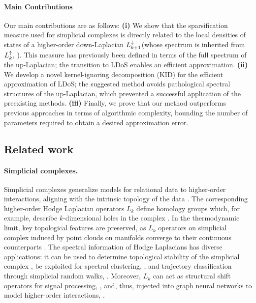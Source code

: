 \paragraph{Main Contributions } 
Our main contributions are as follows: \textbf{(i)} We show that the sparsification measure used for simplicial complexes is directly related to the local densities of states of a higher-order down-Laplacian {\( L_{k+1}^{\downarrow} \)(whose spectrum is inherited from \( L_{k}^{\uparrow} \), \cite{guglielmi2023quantifying})}.
This measure has previously been defined in terms of the full spectrum of the up-Laplacian; the transition to LDoS enables an efficient approximation.
\textbf{(ii)} We develop a novel kernel-ignoring decomposition (KID) for the efficient approximation of LDoS; the suggested method avoids pathological spectral structures of the up-Laplacian, which prevented a successful application of the preexisting methods.
\textbf{(iii)} Finally, we prove that our method outperforms previous approaches in terms of algorithmic complexity, bounding the number of parameters required to obtain a desired approximation error. 



\subsection*{ Related work }
 
\paragraph{Simplicial complexes.}

Simplicial complexes generalize models for relational data to higher-order interactions, aligning with the intrinsic topology of the data \cite{quillen2006homotopical, munkres2018elements}. The corresponding higher-order Hodge Laplacian operators \( L_k \) define homology groups which, for example, describe \( k \)-dimensional holes in the complex \cite{Lim15}. In the thermodynamic limit, key topological features are preserved, as \( L_k \) operators on simplicial complex induced by point clouds on manifolds converge to their continuous counterparts \cite{chen2021decomposition,chen2021helmholtzian}. The spectral information of Hodge Laplacians has diverse applications: it can be used to determine topological stability of the simplicial complex \cite{guglielmi2023quantifying}, 
be exploited for spectral clustering, \cite{ebli2019notion,grande2024node}, and trajectory classification through simplicial random walks, \cite{schaub2019random,grande2024topological}. Moreover, \( L_k \) can act as structural shift operators for signal processing, \cite{barbarossa2020topological}, and, thus, injected into graph neural networks to model higher-order interactions, \cite{ebli2020simplicial,roddenberry2021principled,yang2022simplicial}. 

